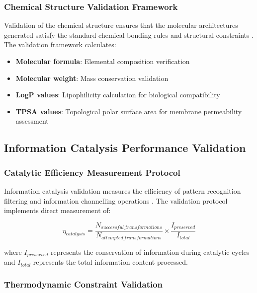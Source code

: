 \documentclass[12pt,a4paper]{article}
\begin{document}
\subsubsection{Chemical Structure Validation Framework}

Validation of the chemical structure ensures that the molecular architectures generated satisfy the standard chemical bonding rules and structural constraints \cite{jensen2017introduction}. The validation framework calculates:

\begin{itemize}
\item \textbf{Molecular formula}: Elemental composition verification
\item \textbf{Molecular weight}: Mass conservation validation
\item \textbf{LogP values}: Lipophilicity calculation for biological compatibility
\item \textbf{TPSA values}: Topological polar surface area for membrane permeability assessment
\end{itemize}

\subsection{Information Catalysis Performance Validation}

\subsubsection{Catalytic Efficiency Measurement Protocol}

Information catalysis validation measures the efficiency of pattern recognition filtering and information channelling operations \cite{mizraji2007biological}. The validation protocol implements direct measurement of:

\begin{equation}
\eta_{catalysis} = \frac{N_{successful\_transformations}}{N_{attempted\_transformations}} \times \frac{I_{preserved}}{I_{total}}
\end{equation}

where $I_{preserved}$ represents the conservation of information during catalytic cycles and $I_{total}$ represents the total information content processed.

\subsubsection{Thermodynamic Constraint Validation}
\end{document}
